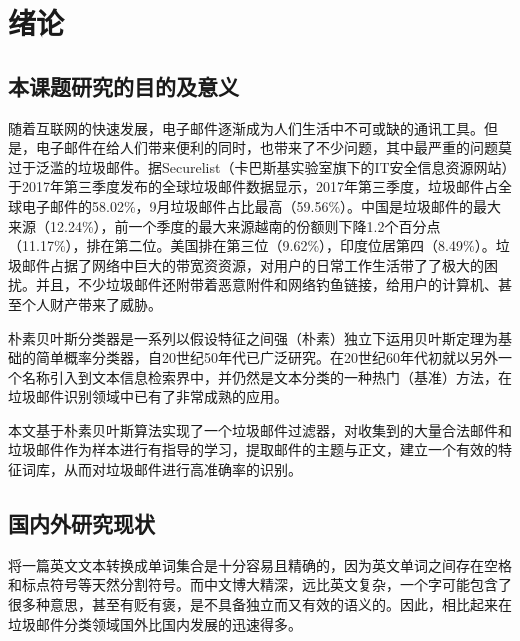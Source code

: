 \documentclass[UTF8,zihao=-4]{ctexart}
\begin{document}
\linespread{1.25}
\tableofcontents
\newpage

\songti{}
\section{绪论}
\subsection{本课题研究的目的及意义}
随着互联网的快速发展，电子邮件逐渐成为人们生活中不可或缺的通讯工具。但是，电子邮件在给人们带来便利的同时，也带来了不少问题，其中最严重的问题莫过于泛滥的垃圾邮件。据Securelist（卡巴斯基实验室旗下的IT安全信息资源网站）于2017年第三季度发布的全球垃圾邮件数据显示，2017年第三季度，垃圾邮件占全球电子邮件的58.02\%，9月垃圾邮件占比最高（59.56\%）。中国是垃圾邮件的最大来源（12.24\%），前一个季度的最大来源越南的份额则下降1.2个百分点（11.17\%），排在第二位。美国排在第三位（9.62\%），印度位居第四（8.49\%）。垃圾邮件占据了网络中巨大的带宽资资源，对用户的日常工作生活带了了极大的困扰。并且，不少垃圾邮件还附带着恶意附件和网络钓鱼链接，给用户的计算机、甚至个人财产带来了威胁。

朴素贝叶斯分类器是一系列以假设特征之间强（朴素）独立下运用贝叶斯定理为基础的简单概率分类器，自20世纪50年代已广泛研究。在20世纪60年代初就以另外一个名称引入到文本信息检索界中，并仍然是文本分类的一种热门（基准）方法，在垃圾邮件识别领域中已有了非常成熟的应用。

本文基于朴素贝叶斯算法实现了一个垃圾邮件过滤器，对收集到的大量合法邮件和垃圾邮件作为样本进行有指导的学习，提取邮件的主题与正文，建立一个有效的特征词库，从而对垃圾邮件进行高准确率的识别。

\subsection{国内外研究现状}

将一篇英文文本转换成单词集合是十分容易且精确的，因为英文单词之间存在空格和标点符号等天然分割符号。而中文博大精深，远比英文复杂，一个字可能包含了很多种意思，甚至有贬有褒，是不具备独立而又有效的语义的。因此，相比起来在垃圾邮件分类领域国外比国内发展的迅速得多。
\end{document}
